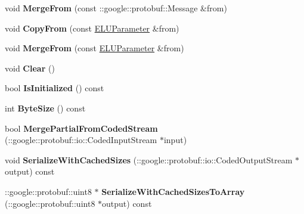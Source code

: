 \begin{DoxyCompactItemize}
void {\bfseries Merge\+From} (const \+::google\+::protobuf\+::\+Message \&from)
\item 
\mbox{\label{classcaffe_1_1_e_l_u_parameter_a970a6d9e3abc017e839a7313cc8120a8}} 
void {\bfseries Copy\+From} (const \mbox{\hyperlink{classcaffe_1_1_e_l_u_parameter}{E\+L\+U\+Parameter}} \&from)
\item 
\mbox{\label{classcaffe_1_1_e_l_u_parameter_a316441369c1760d3b5b134d11f49d7cc}} 
void {\bfseries Merge\+From} (const \mbox{\hyperlink{classcaffe_1_1_e_l_u_parameter}{E\+L\+U\+Parameter}} \&from)
\item 
\mbox{\label{classcaffe_1_1_e_l_u_parameter_a324ec83f799922c6806fa15f3d25ae43}} 
void {\bfseries Clear} ()
\item 
\mbox{\label{classcaffe_1_1_e_l_u_parameter_a50f1304d297c47cd5db56e7c8706ec75}} 
bool {\bfseries Is\+Initialized} () const
\item 
\mbox{\label{classcaffe_1_1_e_l_u_parameter_a873a1b19de2dcfb04716880d368336e6}} 
int {\bfseries Byte\+Size} () const
\item 
\mbox{\label{classcaffe_1_1_e_l_u_parameter_a6b4e08b2555ed11076afffe5629bbf7b}} 
bool {\bfseries Merge\+Partial\+From\+Coded\+Stream} (\+::google\+::protobuf\+::io\+::\+Coded\+Input\+Stream $\ast$input)
\item 
\mbox{\label{classcaffe_1_1_e_l_u_parameter_afa23c047597419a2b914fae75012b1e0}} 
void {\bfseries Serialize\+With\+Cached\+Sizes} (\+::google\+::protobuf\+::io\+::\+Coded\+Output\+Stream $\ast$output) const
\item 
\mbox{\label{classcaffe_1_1_e_l_u_parameter_a9b042a3e5440251775dd02360002d247}} 
\+::google\+::protobuf\+::uint8 $\ast$ {\bfseries Serialize\+With\+Cached\+Sizes\+To\+Array} (\+::google\+::protobuf\+::uint8 $\ast$output) const
\item 
\mbox{\label{classcaffe_1_1_e_l_u_parameter_a9addcbcb558ffdb55fff781ef3450948}} 

\end{DoxyCompactItemize}
